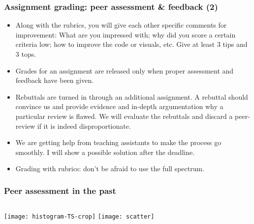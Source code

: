 \begin{frame}
\frametitle{Assignment grading: peer assessment \& feedback (2)}
\begin{itemize}
  \item Along with the rubrics, you will give each other specific comments for improvement: What are you impressed with; why did you score a certain criteria low; how to improve the code or  visuals, etc. Give at least 3 tips and 3 tops.
  \item Grades for an assignment are released only when proper assessment and feedback have been given.
  \item Rebuttals are turned in through an additional assignment. A rebuttal should convince us and provide evidence and in-depth argumentation why a particular review is flawed. We will evaluate the rebuttals and discard a peer-review if it is indeed disproportionate.
  \item We are getting help from teaching assistants to make the process go smoothly. I will show a possible solution after the deadline.
  \item Grading with rubrics: don't be afraid to use the full spectrum.
\end{itemize}
\end{frame}

\begin{frame}
  \frametitle{Peer assessment in the past}
  \begin{columns}
    \centering
      \texttt{[image: histogram-TS-crop]}
    \centering
      \texttt{[image: scatter]}   
  \end{columns}
 \end{frame}

